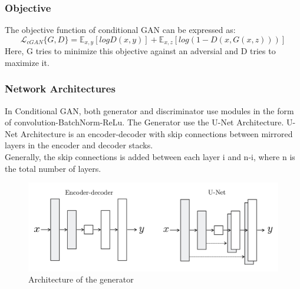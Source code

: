                         \subsubsection{Objective}
                                The objective function of conditional GAN can be expressed as:
                                \begin{equation}
                                        \mathcal{L}_{cGAN}\{G,D\} = \mathbb{E}_{x,y}[log D(x,y)] + \mathbb{E}_{x,z}[log(1-D(x,G(x,z)))]
                                \end{equation}
                                Here, G tries to minimize this objective against an adversial and D tries to maximize it.
                        \subsubsection{Network Architectures}
                                In Conditional GAN, both generator and discriminator use modules in the form of convolution-BatchNorm-ReLu. The Generator use the U-Net Architecture. U-Net Architecture is an encoder-decoder with skip connections between mirrored layers in the encoder and decoder stacks. \\
                                Generally, the skip connections is added between each layer i and n-i, where n is the total number of layers.
                                \begin{figure}[h]
                                        \centering
                                        \includegraphics[width=.8\textwidth]{img/chapter_6/Unet.png}
                                        \caption{Architecture of the generator}
                                        \label{fig:Architecture of the generator}
                                \end{figure}
